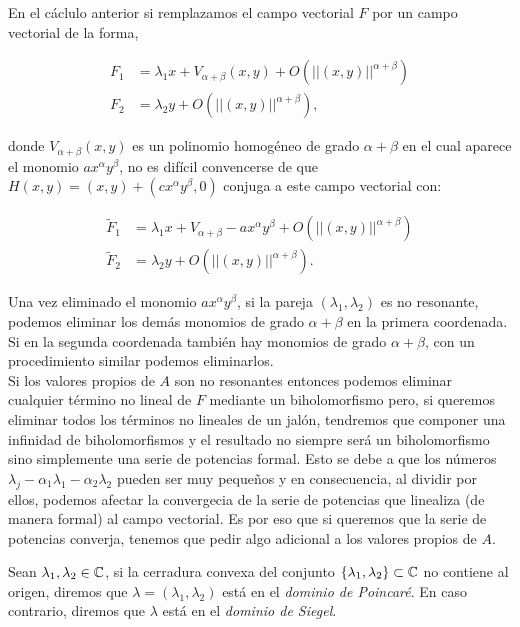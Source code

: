 En el cáclulo anterior si remplazamos el campo vectorial $F$ por un campo vectorial de la forma,

\begin{equation}
\begin{aligned}
F_{1} &= \lambda_{1}x +V_{\alpha+\beta}(x,y)+O(||(x,y)||^{\alpha+\beta})\\
F_{2} &= \lambda_{2}y + O(||(x,y)||^{\alpha+\beta}),
\end{aligned}
\end{equation}

\noindent donde $V_{\alpha+\beta}(x,y)$ es un polinomio homogéneo de grado $\alpha+\beta$ en el cual aparece el monomio $ax^{\alpha}y^{\beta}$, no es difícil convencerse de que $H(x,y)=(x,y)+(cx^{\alpha}y^{\beta},0)$ conjuga a este campo vectorial con:
 
\begin{equation}
\begin{aligned}
\tilde{F}_{1} &= \lambda_{1}x + V_{\alpha+\beta}-ax^{\alpha}y^{\beta}+O(||(x,y)||^{\alpha+\beta})\\
\tilde{F}_{2} &= \lambda_{2}y + O(||(x,y)||^{\alpha+\beta}).
\end{aligned}
\end{equation}

Una vez eliminado el monomio $ax^{\alpha}y^{\beta}$, si la pareja $(\lambda_{1},\lambda_{2})$ es no resonante, podemos eliminar los demás monomios de grado $\alpha+\beta$ en la primera coordenada. Si en la segunda coordenada también hay monomios de grado $\alpha+\beta$, con un procedimiento similar podemos eliminarlos. \\ 
Si los valores propios de $A$ son no resonantes entonces podemos eliminar cualquier término no lineal de $F$ mediante un biholomorfismo pero, si queremos eliminar todos los términos no lineales de un jalón, tendremos que componer una infinidad de biholomorfismos y el resultado no siempre será un biholomorfismo sino simplemente una serie de potencias formal. Esto se debe a que los números $\lambda_{j}-\alpha_{1}\lambda_{1}-\alpha_{2}\lambda_{2}$ pueden ser muy pequeños y en consecuencia, al dividir por ellos, podemos afectar la convergecia de la serie de potencias que linealiza (de manera formal) al campo vectorial. Es por eso que si queremos que la serie de potencias converja, tenemos que pedir algo adicional a los valores propios de $A$.

\begin{defn}
\label{Def:DominioPoincare}
Sean $\lambda_{1},\lambda_{2}\in\mathbb{C}$, si la cerradura convexa del conjunto $\{ \lambda_{1},\lambda_{2}\}\subset\mathbb{C}$ no contiene al origen, diremos que $\lambda=(\lambda_{1},\lambda_{2})$ está en el \emph{dominio de Poincaré}. En caso contrario, diremos que $\lambda$ está en el \emph{dominio de Siegel}.
\end{defn}

